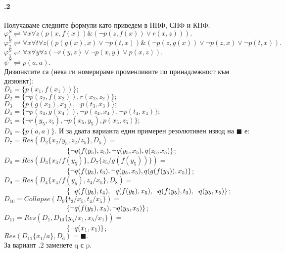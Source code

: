 \documentclass{article}
\begin{document}
\paragraph{\hspace{0.5em} .2}
\begin{addmargin}[1em]{2em}
Получаваме следните формули като приведем в ПНФ, СНФ и КНФ: \\
$\varphi_1^S \rightleftharpoons \forall x \forall z (p(x,f(x))\&(\neg p(z, f(x))\lor r(x,z))). $ \\
$\varphi_2^S \rightleftharpoons \forall x \forall t \forall z((p(g(x),x)\lor \neg p(t,x))\&(\neg p(z, g(x)) \lor \neg p(z,x) \lor \neg p(t,x)). $ \\
$\varphi_3^S \rightleftharpoons \forall x \forall y \forall z (\neg r(y,z) \lor \neg p(x,y) \lor p(x, z)). $ \\
$\psi^S \rightleftharpoons p(a,a).$ \\
Дизюнктите са (нека ги номерираме променливите по принадлежност към дизюнкт): \\
$D_1 = \{ p(x_1,f(x_1))\};$ \\
$D_2 = \{ \neg p(z_2, f(x_2)), r(x_2, z_2)\};$ \\
$D_3 = \{ p(g(x_3), x_3), \neg p(t_3, x_3)\};$ \\
$D_4 = \{ \neg p(z_4,g(x_4)), \neg p(z_4, x_4), \neg p(t_4, x_4)\};$ \\
$D_5 = \{ \neg r(y_5,z_5), \neg p( x_5,y_5), p(x_5, z_5)\};$ \\
$D_6 = \{ p(a,a)\}.$ 
\vskip 0.1in
И за двата варианта един примерен резолютивен извод на $ \blacksquare $ е: \\
$ D_7 = Res(D_2\{x_2/y_5, z_2/z_5\}, D_5) = $\\$ \indent \indent \indent \indent \indent \indent \{ \neg q(f(y_5),z_5), \neg q(y_5, x_5), q(z_5, x_5) \}$; \\
$ D_8 = Res(D_3\{x_3/f(y_5)\}, D_7\{ z_5/g(f(y_5)) \}) = $\\$ \indent \indent \indent \indent \indent \indent \{ \neg q(f(y_5), t_3), \neg q(y_5, x_5), q(g(f(y_5)),x_5)\}$; \\
$ D_9 = Res(D_4\{x_4/f(y_5), z_4/x_5\}, D_8) = $\\$  \indent \indent \indent \indent \indent \indent \{ \neg q(f(y_5),t_4), \neg q(f(y_5),x_5), \neg q(f(y_5), t_3), \neg q(y_5, x_5)\}$;\\
$ D_{10} = Collapse(D_9\{t_3/x_5, t_4/x_5\}) = $\\$  \indent \indent \indent \indent \indent \indent\{\neg q(f(y_5), x_5), \neg q(y_5, x_5)\}$;\\
$ D_{11} = Res(D_1, D_{10}\{y_5/x_1, x_5/x_1 \}) = $\\$  \indent \indent \indent \indent \indent \indent  \{ \neg q(x_1, x_1) \}$;\\
$ Res(D_{11}\{x_1/a\}, D_6) = \blacksquare. $ \\


За вариант .2 заменете q с p.
\end{addmargin}
\end{document}
